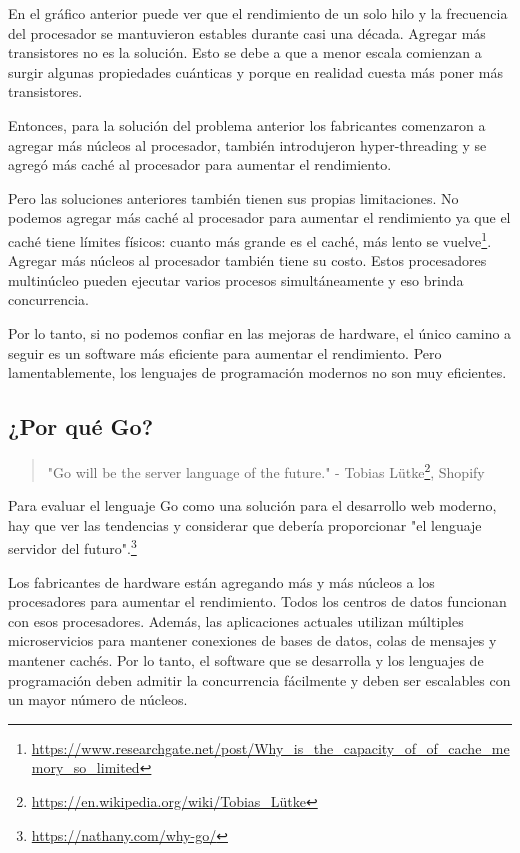 \documentclass[twoside,twocolumn]{article}
\begin{document}
\noindent
En el gráfico anterior puede ver que el rendimiento de un solo hilo y la frecuencia del procesador se mantuvieron estables durante casi una década. Agregar más transistores no es la solución. Esto se debe a que a menor escala comienzan a surgir algunas propiedades cuánticas y porque en realidad cuesta más poner más transistores.

Entonces, para la solución del problema anterior los fabricantes comenzaron a agregar más núcleos al procesador, también introdujeron hyper-threading y se agregó más caché al procesador para aumentar el rendimiento.

Pero las soluciones anteriores también tienen sus propias limitaciones. No podemos agregar más caché al procesador para aumentar el rendimiento ya que el caché tiene límites físicos: cuanto más grande es el caché, más lento se vuelve\footnote{\url{https://www.researchgate.net/post/Why_is_the_capacity_of_of_cache_memory_so_limited}}. Agregar más núcleos al procesador también tiene su costo. Estos procesadores multinúcleo pueden ejecutar varios procesos simultáneamente y eso brinda concurrencia.

Por lo tanto, si no podemos confiar en las mejoras de hardware, el único camino a seguir es un software más eficiente para aumentar el rendimiento. Pero lamentablemente, los lenguajes de programación modernos no son muy eficientes.


\subsection{¿Por qué Go?}

\begin{quote}

	\small "Go will be the server language of the future." - Tobias Lütke\footnote{\url{https://en.wikipedia.org/wiki/Tobias_Lütke}}, Shopify

\end{quote}

\noindent
Para evaluar el lenguaje Go como una solución para el desarrollo web moderno, hay que ver las tendencias y considerar que debería proporcionar "el lenguaje servidor del futuro".\footnote{\url{https://nathany.com/why-go/}}

Los fabricantes de hardware están agregando más y más núcleos a los procesadores para aumentar el rendimiento. Todos los centros de datos funcionan con esos procesadores. Además, las aplicaciones actuales utilizan múltiples microservicios para mantener conexiones de bases de datos, colas de mensajes y mantener cachés. Por lo tanto, el software que se desarrolla y los lenguajes de programación deben admitir la concurrencia fácilmente y deben ser escalables con un mayor número de núcleos.
\end{document}

